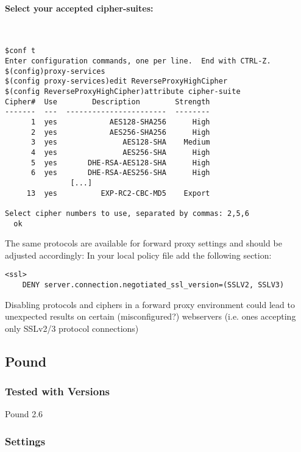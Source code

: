 \paragraph*{Select your accepted cipher-suites:}
~
\begin{lstlisting}
$conf t
Enter configuration commands, one per line.  End with CTRL-Z.
$(config)proxy-services
$(config proxy-services)edit ReverseProxyHighCipher
$(config ReverseProxyHighCipher)attribute cipher-suite
Cipher#  Use        Description        Strength
-------  ---  -----------------------  --------
      1  yes            AES128-SHA256      High
      2  yes            AES256-SHA256      High
      3  yes               AES128-SHA    Medium
      4  yes               AES256-SHA      High
      5  yes       DHE-RSA-AES128-SHA      High
      6  yes       DHE-RSA-AES256-SHA      High
               [...]
     13  yes          EXP-RC2-CBC-MD5    Export

Select cipher numbers to use, separated by commas: 2,5,6
  ok
\end{lstlisting}

The same protocols are available for forward proxy settings and should be adjusted accordingly:
In your local policy file add the following section:
\begin{lstlisting}
<ssl>
    DENY server.connection.negotiated_ssl_version=(SSLV2, SSLV3)
\end{lstlisting}

Disabling protocols and ciphers in a forward proxy environment could lead to unexpected results on certain (misconfigured?) webservers (i.e. ones accepting only SSLv2/3 protocol connections)


\subsection{Pound}

\subsubsection{Tested with Versions}
\begin{itemize*}
  \item Pound 2.6
\end{itemize*}

\subsubsection{Settings}
